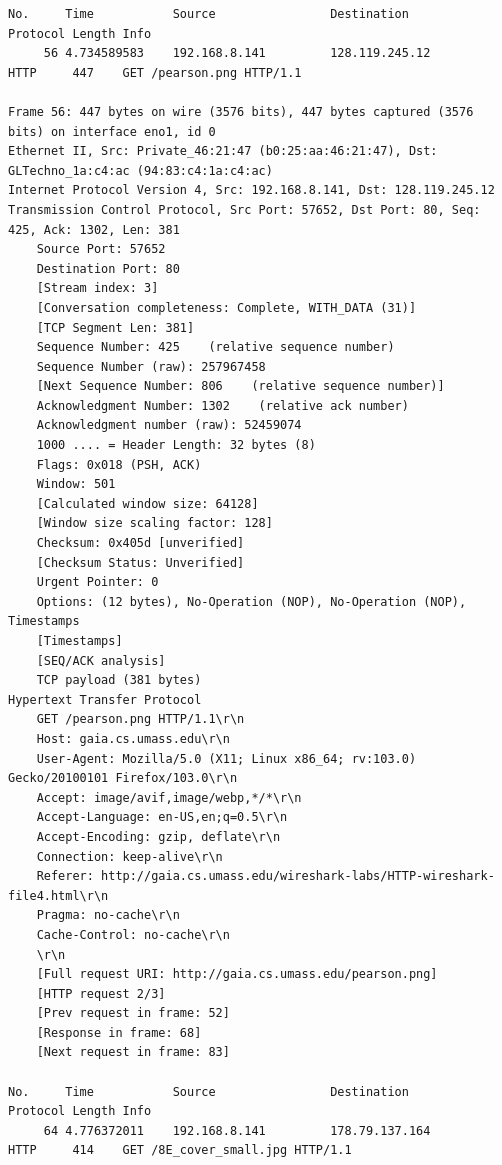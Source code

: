 \documentclass[a4paper,11pt,final]{report}
\begin{document}
\begin{lstlisting}[breaklines]
No.     Time           Source                Destination           Protocol Length Info
     56 4.734589583    192.168.8.141         128.119.245.12        HTTP     447    GET /pearson.png HTTP/1.1 

Frame 56: 447 bytes on wire (3576 bits), 447 bytes captured (3576 bits) on interface eno1, id 0
Ethernet II, Src: Private_46:21:47 (b0:25:aa:46:21:47), Dst: GLTechno_1a:c4:ac (94:83:c4:1a:c4:ac)
Internet Protocol Version 4, Src: 192.168.8.141, Dst: 128.119.245.12
Transmission Control Protocol, Src Port: 57652, Dst Port: 80, Seq: 425, Ack: 1302, Len: 381
    Source Port: 57652
    Destination Port: 80
    [Stream index: 3]
    [Conversation completeness: Complete, WITH_DATA (31)]
    [TCP Segment Len: 381]
    Sequence Number: 425    (relative sequence number)
    Sequence Number (raw): 257967458
    [Next Sequence Number: 806    (relative sequence number)]
    Acknowledgment Number: 1302    (relative ack number)
    Acknowledgment number (raw): 52459074
    1000 .... = Header Length: 32 bytes (8)
    Flags: 0x018 (PSH, ACK)
    Window: 501
    [Calculated window size: 64128]
    [Window size scaling factor: 128]
    Checksum: 0x405d [unverified]
    [Checksum Status: Unverified]
    Urgent Pointer: 0
    Options: (12 bytes), No-Operation (NOP), No-Operation (NOP), Timestamps
    [Timestamps]
    [SEQ/ACK analysis]
    TCP payload (381 bytes)
Hypertext Transfer Protocol
    GET /pearson.png HTTP/1.1\r\n
    Host: gaia.cs.umass.edu\r\n
    User-Agent: Mozilla/5.0 (X11; Linux x86_64; rv:103.0) Gecko/20100101 Firefox/103.0\r\n
    Accept: image/avif,image/webp,*/*\r\n
    Accept-Language: en-US,en;q=0.5\r\n
    Accept-Encoding: gzip, deflate\r\n
    Connection: keep-alive\r\n
    Referer: http://gaia.cs.umass.edu/wireshark-labs/HTTP-wireshark-file4.html\r\n
    Pragma: no-cache\r\n
    Cache-Control: no-cache\r\n
    \r\n
    [Full request URI: http://gaia.cs.umass.edu/pearson.png]
    [HTTP request 2/3]
    [Prev request in frame: 52]
    [Response in frame: 68]
    [Next request in frame: 83]

No.     Time           Source                Destination           Protocol Length Info
     64 4.776372011    192.168.8.141         178.79.137.164        HTTP     414    GET /8E_cover_small.jpg HTTP/1.1 


\end{lstlisting}
\end{document}
